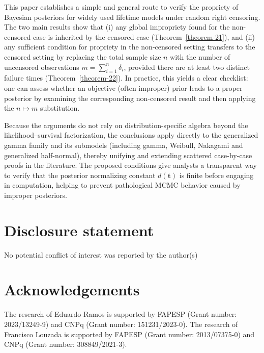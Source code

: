 \documentclass[]{interact}
\newcommand{\bs}{\boldsymbol}
\theoremstyle{plain}%
\theoremstyle{definition}
\theoremstyle{remark}
\begin{document}
This paper establishes a simple and general route to verify the propriety of Bayesian posteriors for widely used lifetime models under random right censoring. The two main results show that (i) any global impropriety found for the non-censored case is inherited by the censored case (Theorem~\ref{theorem-21}), and (ii) any sufficient condition for propriety in the non-censored setting transfers to the censored setting by replacing the total sample size $n$ with the number of uncensored observations $m=\sum_{i=1}^n \delta_i$, provided there are at least two distinct failure times (Theorem~\ref{theorem-22}). In practice, this yields a clear checklist: one can assess whether an objective (often improper) prior leads to a proper posterior by examining the corresponding non-censored result and then applying the $n\mapsto m$ substitution.

Because the arguments do not rely on distribution-specific algebra beyond the likelihood–survival factorization, the conclusions apply directly to the generalized gamma family and its submodels (including gamma, Weibull, Nakagami and generalized half-normal), thereby unifying and extending scattered case-by-case proofs in the literature. The proposed conditions give analysts a transparent way to verify that the posterior normalizing constant $d(\bs t)$ is finite before engaging in computation, helping to prevent pathological MCMC behavior caused by improper posteriors.


\section*{Disclosure statement}

No potential conflict of interest was reported by the author(s)

\section*{Acknowledgements}

 The research of 
 Eduardo Ramos is supported by FAPESP
(Grant number: 2023/13249-9) and CNPq (Grant number:  151231/2023-0). The research of Francisco Louzada is supported by FAPESP (Grant number: 2013/07375-0) and CNPq (Grant number: 308849/2021-3).




\end{document}
